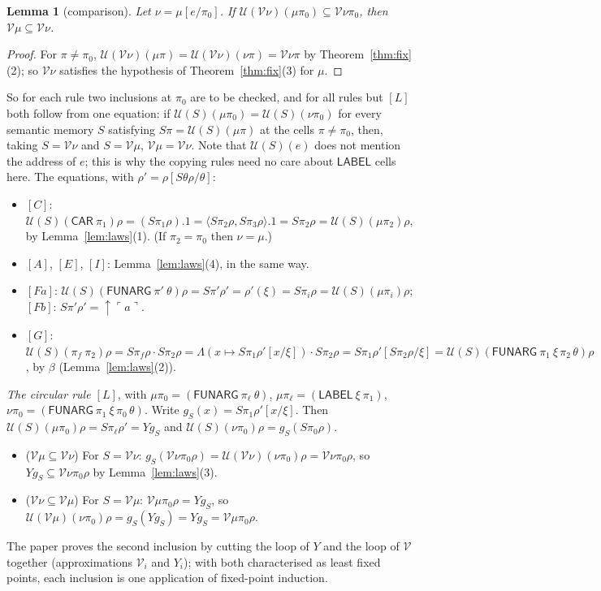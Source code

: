 \documentclass[11pt]{amsart}
\newtheorem{lemma}[theorem]{Lemma}
\theoremstyle{definition}
\theoremstyle{remark}
\newcommand{\kw}[1]{\mathsf{#1}}
\newcommand{\at}[1]{\ulcorner #1\urcorner}
\newcommand{\V}{\mathcal V}
\newcommand{\U}{\mathcal U}
\newcommand{\up}{{\uparrow}}
\begin{document}
\begin{lemma}[comparison]\label{lem:cmp}
Let $\nu=\mu[e/\pi_0]$. If $\U(\V\nu)(\mu\pi_0)\subseteq\V\nu\pi_0$, then
$\V\mu\subseteq\V\nu$.
\end{lemma}

\begin{proof}
For $\pi\ne\pi_0$, $\U(\V\nu)(\mu\pi)=\U(\V\nu)(\nu\pi)=\V\nu\pi$ by
Theorem~\ref{thm:fix}(2); so $\V\nu$ satisfies the hypothesis of
Theorem~\ref{thm:fix}(3) for $\mu$.
\end{proof}

So for each rule two inclusions at $\pi_0$ are to be checked, and for all
rules but $[L]$ both follow from one equation: if
$\U(S)(\mu\pi_0)=\U(S)(\nu\pi_0)$ for every semantic memory $S$ satisfying
$S\pi=\U(S)(\mu\pi)$ at the cells $\pi\ne\pi_0$, then, taking $S=\V\nu$ and
$S=\V\mu$, $\V\mu=\V\nu$. Note that $\U(S)(e)$ does not mention the address
of $e$; this is why the copying rules need no care about $\kw{LABEL}$ cells
here. The equations, with $\rho'=\rho[S\theta\rho/\theta]$:
\begin{itemize}
\item $[C]$: $\U(S)(\kw{CAR}\ \pi_1)\rho=(S\pi_1\rho).1=\langle S\pi_2\rho,S\pi_3\rho\rangle.1
=S\pi_2\rho=\U(S)(\mu\pi_2)\rho$, by Lemma~\ref{lem:laws}(1). (If $\pi_2=\pi_0$
then $\nu=\mu$.)
\item $[A]$, $[E]$, $[I]$: Lemma~\ref{lem:laws}(4), in the same way.
\item $[Fa]$: $\U(S)(\kw{FUNARG}\ \pi'\ \theta)\rho=S\pi'\rho'=\rho'(\xi)=S\pi_i\rho=\U(S)(\mu\pi_i)\rho$;
$[Fb]$: $S\pi'\rho'=\up\at a$.
\item $[G]$: $\U(S)(\pi_f\ \pi_2)\rho=S\pi_f\rho\cdot S\pi_2\rho
=\Lambda(x\mapsto S\pi_1\rho'[x/\xi])\cdot S\pi_2\rho
=S\pi_1\rho'[S\pi_2\rho/\xi]=\U(S)(\kw{FUNARG}\ \pi_1\ \xi\,\pi_2\,\theta)\rho$,
by $\beta$ (Lemma~\ref{lem:laws}(2)).
\end{itemize}

\noindent\emph{The circular rule $[L]$}, with
$\mu\pi_0=(\kw{FUNARG}\ \pi_\ell\ \theta)$, $\mu\pi_\ell=(\kw{LABEL}\ \xi\ \pi_1)$,
$\nu\pi_0=(\kw{FUNARG}\ \pi_1\ \xi\,\pi_0\,\theta)$. Write
$g_S(x)=S\pi_1\rho'[x/\xi]$. Then $\U(S)(\mu\pi_0)\rho=S\pi_\ell\rho'=Yg_S$
and $\U(S)(\nu\pi_0)\rho=g_S(S\pi_0\rho)$.
\begin{itemize}
\item ($\V\mu\subseteq\V\nu$) For $S=\V\nu$: $g_S(\V\nu\pi_0\rho)=\U(\V\nu)(\nu\pi_0)\rho=\V\nu\pi_0\rho$,
so $Yg_S\subseteq\V\nu\pi_0\rho$ by Lemma~\ref{lem:laws}(3).
\item ($\V\nu\subseteq\V\mu$) For $S=\V\mu$: $\V\mu\pi_0\rho=Yg_S$, so
$\U(\V\mu)(\nu\pi_0)\rho=g_S(Yg_S)=Yg_S=\V\mu\pi_0\rho$.
\end{itemize}
The paper proves the second inclusion by cutting the loop of $Y$ and the
loop of $\V$ together (approximations $\V_i$ and $Y_i$); with both
characterised as least fixed points, each inclusion is one application of
fixed-point induction.
\end{document}
